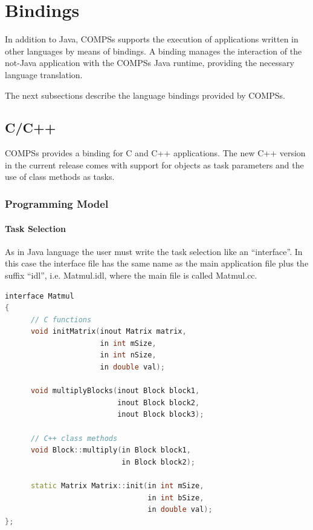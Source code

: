 \section{Bindings}
\label{sec:Bindings}

In addition to Java, COMPSs supports the execution of applications written in other languages by means of bindings. A binding manages the interaction of the not-Java application with the COMPSs Java runtime, providing the necessary language translation.

The next subsections describe the language bindings provided by COMPSs.

\subsection{C/C++}

COMPSs provides a binding for C and C++ applications. The new C++ version in the current release comes with support for objects as task parameters and the use of class methods as tasks.

\subsubsection{Programming Model}

\paragraph{Task Selection}
As in Java language the user must write the task selection like an ``interface''. In this case the interface file has the same name as the main application file plus the suffix ``idl'', i.e. Matmul.idl, where the main file is called Matmul.cc.

\begin{lstlisting}[language=C++]
interface Matmul
{
      // C functions
      void initMatrix(inout Matrix matrix,
                      in int mSize,
                      in int nSize,
                      in double val);
                      
      void multiplyBlocks(inout Block block1,
                          inout Block block2,
                          inout Block block3);
                          
      // C++ class methods
      void Block::multiply(in Block block1,
                           in Block block2);
                           
      static Matrix Matrix::init(in int mSize,
                                 in int bSize,
                                 in double val);
};
\end{lstlisting}

